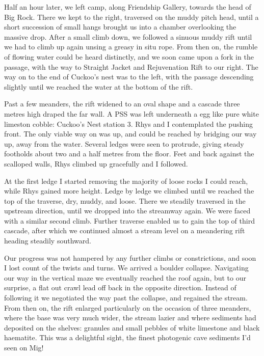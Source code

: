 \documentclass[onecolumn]{book}
\begin{document}
Half an hour later, we left camp, along Friendship Gallery, towards the head of Big Rock. There we kept to the right, traversed on the muddy pitch head, until a short succession of small hangs brought us into a chamber overlooking the massive drop. After a small climb down, we followed a sinuous muddy rift until we had to climb up again unsing a greasy in situ rope. From then on, the rumble of flowing water could be heard distinctly, and we soon came upon a fork in the passage, with the way to Straight Jacket and Rejuvenation Rift to our right. The way on to the end of Cuckoo's nest was to the left, with the passage descending slightly until we reached the water at the bottom of the rift.

Past a few meanders, the rift widened to an oval shape and a cascade three metres high draped the far wall. A PSS was left underneath a egg like pure white limeston cobble: Cuckoo's Nest station 3. Rhys and I contemplated the pushing front. The only viable way on was up, and could be reached by bridging our way up, away from the water. Several ledges were seen to protrude, giving steady footholds about two and a half metres from the floor. Feet and back against the scalloped walls, Rhys  climbed up gracefully and I followed.

At the first ledge I started removing the majority of loose rocks I could reach, while Rhys gained more height. Ledge by ledge we climbed until we reached the top of the traverse, dry, muddy, and loose. There we steadily traversed in the upstream direction, until we dropped into the streamway again. We were faced with a similar second climb. Further traverse enabled us to gain the top of third cascade, after which we continued almost a stream level on a meandering rift heading steadily southward.

Our progress was not hampered by any further climbs or constrictions, and soon I lost count of the twists and turns. We arrived a boulder collapse. Navigating our way in the vertical maze we eventually reached the roof again, but to our surprise, a flat out crawl lead off back in the opposite direction. Instead of following it we negotiated the way past the collapse, and regained the stream. From then on, the rift enlarged particularly on the occasion of three meanders, where the base was very much wider, the stream lazier and where sediments had deposited on the shelves: granules and small pebbles of white limestone and black haematite. This was a delightful sight, the finest photogenic cave sediments I'd seen on Mig! 
\end{document}
